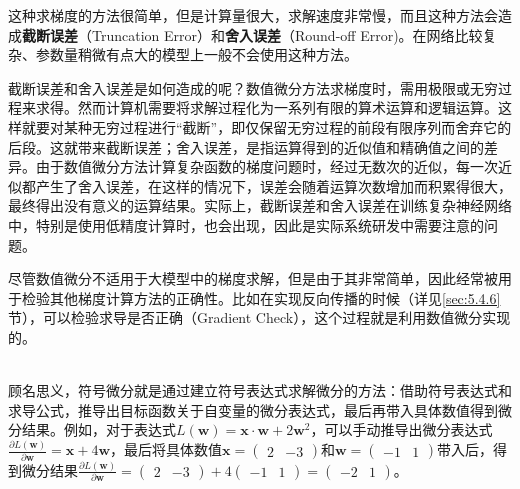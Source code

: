 \parinterval 这种求梯度的方法很简单，但是计算量很大，求解速度非常慢，而且这种方法会造成{\small\sffamily\bfseries{截断误差}}（Truncation Error）和{\small\sffamily\bfseries{舍入误差}}（Round-off Error)。在网络比较复杂、参数量稍微有点大的模型上一般不会使用这种方法。

\parinterval 截断误差和舍入误差是如何造成的呢？数值微分方法求梯度时，需用极限或无穷过程来求得。然而计算机需要将求解过程化为一系列有限的算术运算和逻辑运算。这样就要对某种无穷过程进行``截断''，即仅保留无穷过程的前段有限序列而舍弃它的后段。这就带来截断误差；舍入误差，是指运算得到的近似值和精确值之间的差异。由于数值微分方法计算复杂函数的梯度问题时，经过无数次的近似，每一次近似都产生了舍入误差，在这样的情况下，误差会随着运算次数增加而积累得很大，最终得出没有意义的运算结果。实际上，截断误差和舍入误差在训练复杂神经网络中，特别是使用低精度计算时，也会出现，因此是实际系统研发中需要注意的问题。

\parinterval 尽管数值微分不适用于大模型中的梯度求解，但是由于其非常简单，因此经常被用于检验其他梯度计算方法的正确性。比如在实现反向传播的时候（详见\ref{sec:5.4.6}节），可以检验求导是否正确（Gradient Check），这个过程就是利用数值微分实现的。\\ \\

%

\vspace{0.5em}

\parinterval 顾名思义，符号微分就是通过建立符号表达式求解微分的方法：借助符号表达式和求导公式，推导出目标函数关于自变量的微分表达式，最后再带入具体数值得到微分结果。例如，对于表达式$ L(\mathbf w)=\mathbf x\cdot \mathbf w+2\mathbf w^2 $，可以手动推导出微分表达式$ \frac{\partial L(\mathbf w)}{\partial \mathbf w}=\mathbf x+4\mathbf w  $，最后将具体数值$ \mathbf x = {(\begin{array}{cc} 2 & -3\end{array})} $和$ \mathbf w = {(\begin{array}{cc} -1 & 1\end{array})} $带入后，得到微分结果$\frac{\partial L(\mathbf w)}{\partial \mathbf w}= {(\begin{array}{cc} 2 & -3\end{array})}+4{(\begin{array}{cc} -1 & 1\end{array})}= {(\begin{array}{cc} -2 & 1\end{array})}$。

